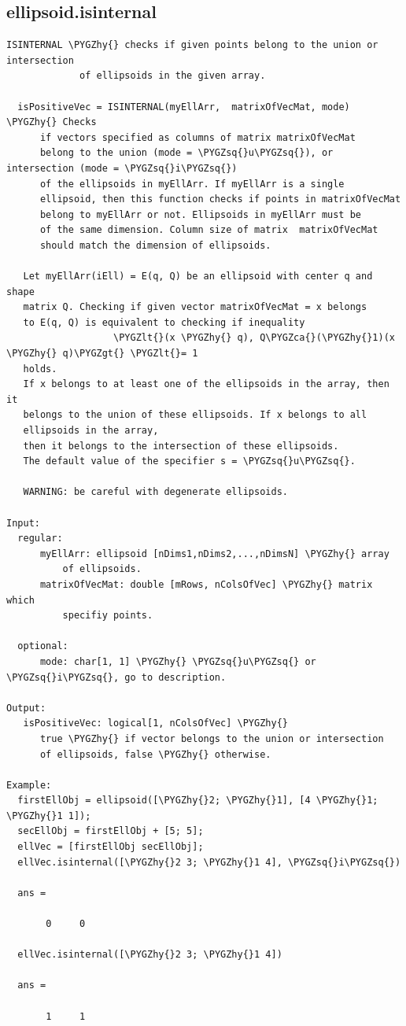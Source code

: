 \documentclass[letterpaper,10pt,english]{sphinxmanual}
\def\PYGZca{\char`\^}
\def\PYGZlt{\char`\<}
\def\PYGZgt{\char`\>}
\def\PYGZhy{\char`\-}
\def\PYGZsq{\char`\'}
\begin{document}
\subsection{ellipsoid.isinternal}
\label{chap_functions:ellipsoid-isinternal}
\begin{Verbatim}[commandchars=\\\{\}]
ISINTERNAL \PYGZhy{} checks if given points belong to the union or intersection
             of ellipsoids in the given array.

  isPositiveVec = ISINTERNAL(myEllArr,  matrixOfVecMat, mode) \PYGZhy{} Checks
      if vectors specified as columns of matrix matrixOfVecMat
      belong to the union (mode = \PYGZsq{}u\PYGZsq{}), or intersection (mode = \PYGZsq{}i\PYGZsq{})
      of the ellipsoids in myEllArr. If myEllArr is a single
      ellipsoid, then this function checks if points in matrixOfVecMat
      belong to myEllArr or not. Ellipsoids in myEllArr must be
      of the same dimension. Column size of matrix  matrixOfVecMat
      should match the dimension of ellipsoids.

   Let myEllArr(iEll) = E(q, Q) be an ellipsoid with center q and shape
   matrix Q. Checking if given vector matrixOfVecMat = x belongs
   to E(q, Q) is equivalent to checking if inequality
                   \PYGZlt{}(x \PYGZhy{} q), Q\PYGZca{}(\PYGZhy{}1)(x \PYGZhy{} q)\PYGZgt{} \PYGZlt{}= 1
   holds.
   If x belongs to at least one of the ellipsoids in the array, then it
   belongs to the union of these ellipsoids. If x belongs to all
   ellipsoids in the array,
   then it belongs to the intersection of these ellipsoids.
   The default value of the specifier s = \PYGZsq{}u\PYGZsq{}.

   WARNING: be careful with degenerate ellipsoids.

Input:
  regular:
      myEllArr: ellipsoid [nDims1,nDims2,...,nDimsN] \PYGZhy{} array
          of ellipsoids.
      matrixOfVecMat: double [mRows, nColsOfVec] \PYGZhy{} matrix which
          specifiy points.

  optional:
      mode: char[1, 1] \PYGZhy{} \PYGZsq{}u\PYGZsq{} or \PYGZsq{}i\PYGZsq{}, go to description.

Output:
   isPositiveVec: logical[1, nColsOfVec] \PYGZhy{}
      true \PYGZhy{} if vector belongs to the union or intersection
      of ellipsoids, false \PYGZhy{} otherwise.

Example:
  firstEllObj = ellipsoid([\PYGZhy{}2; \PYGZhy{}1], [4 \PYGZhy{}1; \PYGZhy{}1 1]);
  secEllObj = firstEllObj + [5; 5];
  ellVec = [firstEllObj secEllObj];
  ellVec.isinternal([\PYGZhy{}2 3; \PYGZhy{}1 4], \PYGZsq{}i\PYGZsq{})

  ans =

       0     0

  ellVec.isinternal([\PYGZhy{}2 3; \PYGZhy{}1 4])

  ans =

       1     1
\end{Verbatim}
\end{document}
